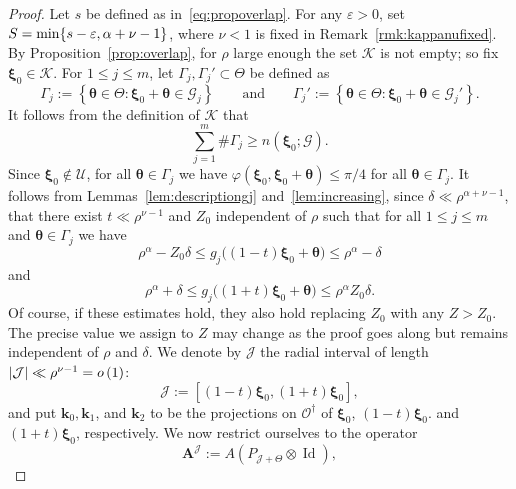 \documentclass[AHL,Unicode,longabstracts,published]{cedram}
\DeclareMathOperator{\Id}{Id}
\newcommand{\CG}{\mathcal{G}}
\newcommand{\CJ}{\mathcal{J}}
\newcommand{\CK}{\mathcal{K}}
\newcommand{\CO}{\mathcal{O}}
\newcommand{\CU}{\mathcal{U}}
\newcommand{\btheta}{\boldsymbol \theta}
\newcommand{\bxi}{\boldsymbol \xi}
\newcommand{\BA}{\mathbf A}
\newcommand{\bk}{\mathbf k}
\renewcommand{\phi}{\varphi}
\newcommand{\eps}{\varepsilon}
\newcommand{\smallo}[1]{o\left(#1 \right)}
\newcommand{\abs}[1]{\left\lvert #1 \right\rvert}
\newcommand{\set}[1]{\left\{ #1 \right\}}
\begin{document}
\begin{proof}
Let $s$ be defined as in~\eqref{eq:propoverlap}. For any $\eps > 0$, set $S = \min \{s - \eps, \alpha + \nu\linebreak - 1\}$, where $\nu < 1$ is fixed in Remark~\ref{rmk:kappanufixed}. By Proposition~\ref{prop:overlap}, for $\rho$ large enough the set $\CK$ is not empty; so fix $\bxi_0 \in \CK$. For $1 \le j \le m$, let $\Gamma_j, \Gamma_j' \subset \Theta$ be defined as
\begin{equation}
\Gamma_j := \set{\btheta \in \Theta : \bxi_0 + \btheta \in \CG_j}
\qquad
\text{and} \qquad \Gamma_j' := \set{\btheta \in \Theta : \bxi_0 +
\btheta \in \CG_j'}.
\end{equation}
It follows from the definition of $\CK$ that
\begin{equation}
\sum_{j=1}^m \#\Gamma_j \ge n(\bxi_0;\CG).
\end{equation}
Since $\bxi_0 \not \in \CU$, for all $\btheta \in \Gamma_j$ we have $\phi(\bxi_0,\bxi_0 + \btheta) \le \pi/4$ for all $\btheta \in \Gamma_j$. It follows from Lemmas~\ref{lem:descriptiongj} and~\ref{lem:increasing}, since $\delta \ll \rho^{\alpha + \nu - 1}$, that there exist $t \ll \rho^{\nu - 1}$ and $Z_0$ independent of $\rho$ such that for all $1 \le j \le m$ and $\btheta
\in \Gamma_j$ we have
\begin{equation}\label{eq:botovlp}
\rho^\alpha - Z_0\delta \le g_j\big((1 - t) \bxi_0 + \btheta \big) \le
\rho^\alpha - \delta
\end{equation}
and
\begin{equation}\label{eq:topovlp}
\rho^\alpha + \delta \le g_j\big((1 + t) \bxi_0 + \btheta \big) \le
\rho^\alpha Z_0 \delta.
\end{equation}
Of course, if these estimates hold, they also hold replacing $Z_0$ with any $Z > Z_0$. The precise value we assign to $Z$ may change as the proof goes along but remains independent of $\rho$ and $\delta$. We denote by $\CJ$ the radial interval of length $\abs \CJ \ll \rho^{\nu - 1}\linebreak = \smallo 1$:
\begin{equation}
\CJ := [(1-t) \bxi_0, (1+t) \bxi_0],
\end{equation}
and put $\bk_0, \bk_1$, and $\bk_2$ to be the projections on $\CO^\dagger$ of $\bxi_0$, $(1-t)\bxi_0$. and $(1+t)\bxi_0$, respectively. We now restrict ourselves to the operator
\begin{equation}
\BA^\CJ := A(P_{\CJ + \Theta} \otimes \Id),
\end{equation}

\end{proof}
\end{document}
